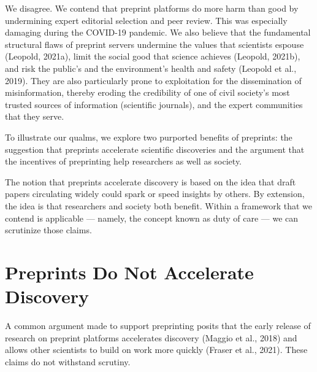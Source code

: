\documentclass[authordate, perspective, issue]{jote-new-article}
\begin{document}
	We disagree. We contend that preprint platforms do more harm than good by undermining expert editorial selection and peer review. This was especially damaging during the COVID-19 pandemic. We also believe that the fundamental structural flaws of preprint servers undermine the values that scientists espouse (Leopold, 2021a), limit the social good that science achieves (Leopold, 2021b), and risk the public's and the environment's health and safety (Leopold et al., 2019). They are also particularly prone to exploitation for the dissemination of misinformation, thereby eroding the credibility of one of civil society's most trusted sources of information (scientific journals), and the expert communities that they serve.







	To illustrate our qualms, we explore two purported benefits of preprints: the suggestion that preprints accelerate scientific discoveries and the argument that the incentives of preprinting help researchers as well as society.







	The notion that preprints accelerate discovery is based on the idea that draft papers circulating widely could spark or speed insights by others. By extension, the idea is that researchers and society both benefit. Within a framework that we contend is applicable — namely, the concept known as duty of care — we can scrutinize those claims.







	\section{Preprints Do Not Accelerate Discovery}







	A common argument made to support preprinting posits that the early release of research on preprint platforms accelerates discovery (Maggio et al., 2018) and allows other scientists to build on work more quickly (Fraser et al., 2021). These claims do not withstand scrutiny.
\end{document}
